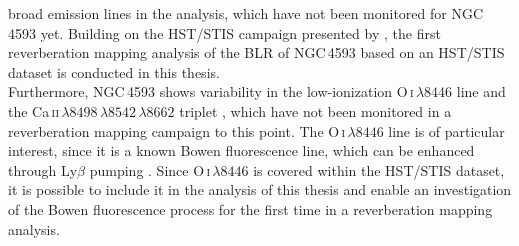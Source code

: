 broad emission lines in the analysis, which have not been monitored for NGC\,4593 yet. Building on the HST/STIS campaign presented by \cite{cackett2018accretion}, the first reverberation mapping analysis of the BLR of NGC\,4593 based on an HST/STIS dataset is conducted in this thesis.\\
Furthermore, NGC\,4593 shows variability in the low-ionization O\,\textsc{i}$\,\lambda8446$ line and the Ca\,\textsc{ii}$\,\lambda8498\,\lambda8542\,\lambda8662$ triplet \parencite{Ochmann_2025}, which have not been monitored in a reverberation mapping campaign to this point. The O\,\textsc{i}$\,\lambda8446$ line is of particular interest, since it is a known Bowen fluorescence line, which can be enhanced through Ly$\beta$ pumping \parencite{Bowen_1947, grandi1980}. Since O\,\textsc{i}$\,\lambda8446$ is covered within the HST/STIS dataset, it is possible to include it in the analysis of this thesis and enable an investigation of the Bowen fluorescence process for the first time in a reverberation mapping analysis.